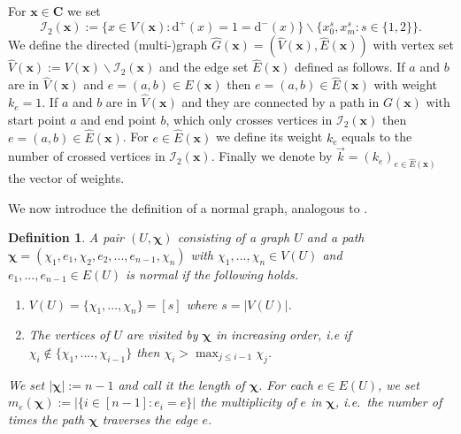 \documentclass[11pt]{article}
\newcommand{\patx}{\boldsymbol{x}}
\newcommand{\patchi}{\boldsymbol{\chi}}
\theoremstyle{plain}
\newtheorem{defi}{Definition}[section]
\theoremstyle{remark}
\numberwithin{equation}{section}
\begin{document}
For $\patx \in \boldsymbol C$ we set
\begin{equation*}
    \mathcal{I}_2(\patx) := \{ x \in V(\patx) \colon   \mathrm{d}^+ (x)= 1 = \mathrm{d}^-(x)\} \backslash \{x_{0}^s, x_{m}^s \colon s\in  \{1,2\}\}. 
\end{equation*}
We define the directed  (multi-)graph $\hat{G}(\patx)=(\hat{V}(\patx),\hat{E}(\patx))$ with vertex set $\hat{V}(\patx) := V(\patx) \backslash \mathcal{I}_{2}(\patx)$ and the edge set $\hat{E}(\patx)$ defined as follows. 
If $a$ and $b$ are in $\hat{V}(\patx)$ and $e=(a,b) \in E(\patx)$ then $e=(a,b) \in \hat{E}(\patx)$ with weight $k_{e}=1$. 
If $a$ and $b$ are in $\hat{V}(\patx)$ and they are connected by a path in $G(\patx)$ with start point $a$ and end point $b$, which only crosses vertices 
in $\mathcal{I}_2(\patx)$ then $e=(a,b) \in \hat{E}(\patx)$. For $e\in \hat{E}(\patx)$ we define its weight $k_{e}$ equals to the number of crossed vertices in $\mathcal{I}_2(\patx)$.
Finally we denote by $\vec{k} = (k_{e})_{e\in \hat{E}(\patx)}$ the vector of weights.

We now introduce the definition of a normal graph, analogous to \cite[Definition 5.4]{BBK_spec_radii}.
\begin{defi}\label{def:normal_graph}
A pair $(U,\patchi)$ consisting of a graph $U$ and a path $\patchi=(\chi_1,e_1,\chi_2,e_2,...,e_{n-1},\chi_n)$ with $\chi_1,...,\chi_n \in V(U)$ and $e_1,...,e_{n-1} \in E(U)$ is \textup{normal} if the following holds.
\begin{enumerate}[label=(\roman*)]
    \item $V(U) = \{\chi_1,...,\chi_n\} = [s] $ where $s = |V(U)|$.
    \item The vertices of $U$ are visited by $\patchi $ in increasing order, i.e if $\chi_{i} \notin \{\chi_1,....,\chi_{i-1}\}$ then $\chi_i > \max_{j \le i-1} \chi_j$.
\end{enumerate}
 We set  $|\patchi| := n-1$ and call it the \textup{length of $\patchi$}. 
 For each $e \in E(U)$, we set $m_{e}(\patchi) := |\{ i \in [n-1] \colon e_i=e\}|$ the \textup{multiplicity} of $e$ in $\patchi$, i.e.\ the number of times the path $\patchi$ 
 traverses the edge $e$.
\end{defi}
\end{document}
